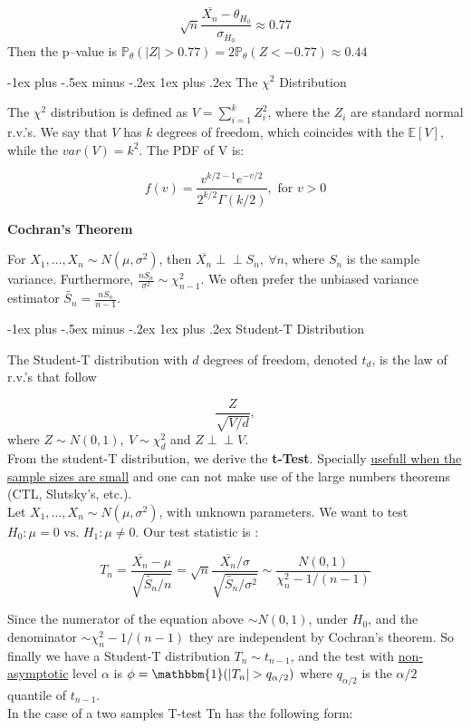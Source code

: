 \documentclass[9pt,landscape]{article}
\makeatletter
\renewcommand{\subsubsection}{\@startsection{subsubsection}{3}{0mm}%
                                {-1ex plus -.5ex minus -.2ex}%
                                {1ex plus .2ex}%
                                {\normalfont\small\bfseries}}
\makeatother
\begin{document}
\begin{multicols}{3}
$$\sqrt{n} \frac{\overline{X_n} - \theta_{H_0}}{\sigma_{H_0}} \approx 0.77$$
Then the p--value is $\mathbb{P}_\theta (|Z| > 0.77) = 2 \mathbb{P}_\theta(Z < - 0.77) \approx 0.44$

\subsubsection{The \texorpdfstring{$\chi^2$}{TEXT} Distribution}

The $\chi^2$ distribution is defined as $V = \sum_{i = 1}^{k} Z^{2}_{i}$, where the $Z_i$ are standard normal r.v.'s.
We say that $V$ has $k$ degrees of freedom, which coincides with the $\mathbb{E}[V]$, while the $var(V) = k^2$. The PDF of V is:

$$f(v) = \frac{v^{k/2 - 1} e^{-v/2}}{2^{k/2} \Gamma(k/2)}, \text{ for } v > 0$$

\textbf{Cochran's Theorem}

For $X_1,\dots, X_n \sim  N(\mu, \sigma^2)$, then $\overline{X_n} {\perp \!\!\! \perp} S_n, \: \forall n$, where $S_n$ is the sample variance. 
Furthermore, $\frac{n S_n}{\sigma^2} \sim \chi^{2}_{n-1}$. We often prefer the unbiased variance estimator $\tilde{S_n} = \frac{n S_n}{n-1}$.

\subsubsection{Student-T Distribution}

The Student-T distribution with $d$ degrees of freedom, denoted $t_d$, is the law of r.v.'s that follow 

$$\frac{Z}{\sqrt{V/d}},$$ where $Z \sim N(0, 1), \: V \sim \chi^{2}_{d}$ and $Z {\perp \!\!\! \perp} V$.\\

From the student-T distribution, we derive the \textbf{t-Test}. Specially \underline{usefull when the sample sizes are small} and one can not make use of the 
large numbers theorems (CTL, Slutsky's, etc.).\\

Let $X_1,\dots, X_n \sim  N(\mu, \sigma^2)$, with unknown parameters. We want to test $H_0: \mu = 0 \text{ vs. } H_1: \mu \ne 0$. Our test statistic is :

$$T_n = \frac{\overline{X_n} - \mu}{\sqrt{\tilde{S_n}/n}} = \sqrt{n} \frac{\overline{X_n}/\sigma}{\sqrt{\tilde{S_n}/\sigma^2}} \sim \frac{N(0, 1)}{\chi^{2}_n-1 / (n-1)}$$

Since the numerator of the equation above $\sim N(0, 1)$, under $H_0$, and the denominator $\sim \chi^{2}_n-1 / (n-1)$ they are independent by Cochran's theorem.
So finally we have a Student-T distribution $T_n \sim t_{n-1}$, and the test with \underline{non-asymptotic} level $\alpha$ is 
$\phi = \mathbbm{1}(|T_n| > q_{\alpha/2})$ where $q_{\alpha/2}$ is the $\alpha/2$ quantile of $t_{n-1}$.\\
In the case of a two samples T-test Tn has the following form: 


\end{multicols}
\end{document}
